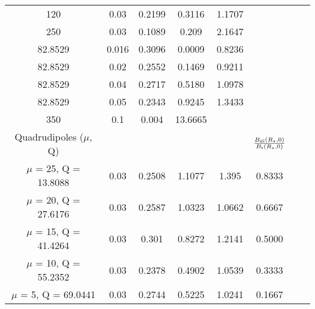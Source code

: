 \documentclass[fleqn,usenatbib]{mnras}
\newcommand{\rstar}{\ensuremath{R_{\star}}}
\begin{document}
\begin{table}
\begin{tabular}{*{8}{c}}
120 & 0.03  & 0.2199 & 0.3116 & 1.1707\\
250 & 0.03  & 0.1089 & 0.209 & 2.1647\\
82.8529 & 0.016  & 0.3096 & 0.0009 & 0.8236\\
82.8529 & 0.02  & 0.2552 & 0.1469 & 0.9211\\
82.8529 & 0.04  & 0.2717 & 0.5180 & 1.0978\\
82.8529 & 0.05  & 0.2343 & 0.9245 & 1.3433\\
350 & 0.1  & 0.004 & 13.6665  &  \\ %
\hline 
 Quadrudipoles ($\mu$, Q) & & & & & $\frac{B_{\rm di}(\rstar,0)}{B_{\rm t}(\rstar,0)}$\\
\hline
$\mu$ = 25, Q = 13.8088 & 0.03  & 0.2508 & 1.1077 & 1.395 & 0.8333\\
$\mu$ = 20, Q = 27.6176 & 0.03  & 0.2587 & 1.0323 & 1.0662 & 0.6667\\
$\mu$ = 15, Q = 41.4264 & 0.03  & 0.301 & 0.8272 & 1.2141 & 0.5000\\
$\mu$ = 10, Q = 55.2352 & 0.03  & 0.2378 & 0.4902 & 1.0539 & 0.3333\\
$\mu$ = 5,  Q = 69.0441 & 0.03  & 0.2744 & 0.5225 & 1.0241 & 0.1667\\
\hline
\end{tabular}
\end{table}
\end{document}
